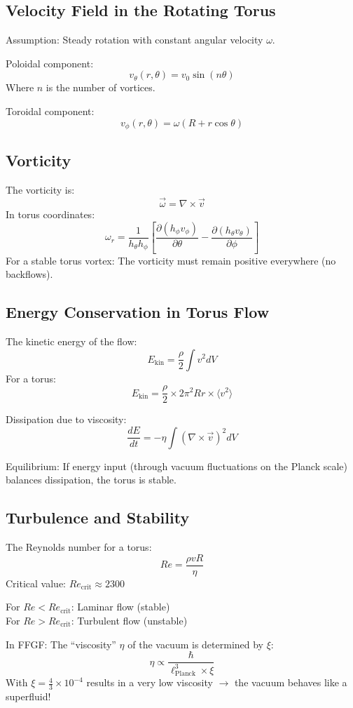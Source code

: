 \subsection{Velocity Field in the Rotating Torus}
Assumption: Steady rotation with constant angular velocity \( \omega \).

Poloidal component:
\[
v_\theta(r, \theta) = v_0 \sin(n \theta)
\]
Where \( n \) is the number of vortices.

Toroidal component:
\[
v_\phi(r, \theta) = \omega (R + r \cos \theta)
\]

\subsection{Vorticity}
The vorticity is:
\[
\vec{\omega} = \nabla \times \vec{v}
\]
In torus coordinates:
\[
\omega_r = \frac{1}{h_\theta h_\phi} \left[ \frac{\partial (h_\phi v_\phi)}{\partial \theta} - \frac{\partial (h_\theta v_\theta)}{\partial \phi} \right]
\]
For a stable torus vortex: The vorticity must remain positive everywhere (no backflows).

\subsection{Energy Conservation in Torus Flow}
The kinetic energy of the flow:
\[
E_{\text{kin}} = \frac{\rho}{2} \int v^2 dV
\]
For a torus:
\[
E_{\text{kin}} = \frac{\rho}{2} \times 2\pi^2 R r \times \langle v^2 \rangle
\]

Dissipation due to viscosity:
\[
\frac{dE}{dt} = -\eta \int (\nabla \times \vec{v})^2 dV
\]

Equilibrium: If energy input (through vacuum fluctuations on the Planck scale) balances dissipation, the torus is stable.

\subsection{Turbulence and Stability}
The Reynolds number for a torus:
\[
Re = \frac{\rho v R}{\eta}
\]
Critical value: \( Re_{\text{crit}} \approx 2300 \)

For \( Re < Re_{\text{crit}} \): Laminar flow (stable) \\
For \( Re > Re_{\text{crit}} \): Turbulent flow (unstable)

In FFGF:
The ``viscosity'' \( \eta \) of the vacuum is determined by \( \xi \):
\[
\eta \propto \frac{\hbar}{\ell_{\text{Planck}}^3 \times \xi}
\]
With \( \xi = \frac{4}{3} \times 10^{-4} \) results in a very low viscosity \( \rightarrow \) the vacuum behaves like a superfluid!

